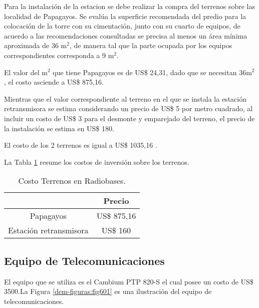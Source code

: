 Para la instalación de la estacion se debe realizar la compra del terrenos sobre las localidad de Papagayos. Se evalúa la superficie recomendada del predio para la colocación de la torre con su cimentación, junto con su cuarto de equipos, de acuerdo a las recomendaciones consultadas se precisa al menos un área mínima aproximada de 36 m$^{2}$, de manera tal que la parte ocupada por los equipos correspondientes corresponda a 9 m$^{2}$\cite{recomendacion}.

El valor del m$^{2}$ que tiene Papagayos es de US\$  24,31, dado que se necesitan 36m$^{2}$, el costo asciende a US\$  875,16.


Mientras que el valor correspondiente al terreno en el que se instala la estación retransmisora se estima considerando un precio de US\$  5 por metro cuadrado, al incluir un costo de US\$  3 \cite{terreno3} para el desmonte y emparejado del terreno, el precio de la instalación se estima en US\$  180.

El costo de los 2 terrenos es igual a US\$  1035,16 \cite{terreno1}\cite{terreno3}.


La Tabla \ref{tab:terrenos} resume los costos de inversión sobre los terrenos.

\begin{table}[H]
  \centering  
    \begin{tabular}{|c|c|}
    \hline
    \rowcolor[HTML]{C5D9F1}{\textbf{Ubicación}} & {\textbf{Precio}} \bigstrut\\
    \hline
    Papagayos & US\$  875,16 \bigstrut\\
    \hline
    Estación retransmisora & US\$  160 \bigstrut\\
    \hline
    \end{tabular}%
    \caption{Costo Terrenos en Radiobases.}
  \label{tab:terrenos}%
\end{table}%




\subsection{Equipo de Telecomunicaciones}

El equipo que se utiliza es el Cambium PTP 820-S el cual posee un costo de US\$ 3500.La Figura \ref{dem-figuras:fig601} es una ilustración del equipo de telecomunicaciones. 



